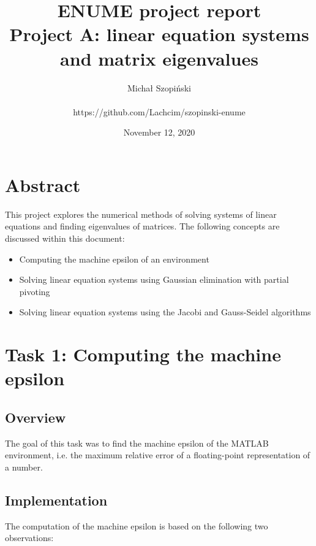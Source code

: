 \documentclass{article}
\begin{document}
	\title{ENUME project report\\Project A: linear equation systems\\and matrix
	eigenvalues}
	\author{Michał Szopiński\\\\https://github.com/Lachcim/szopinski-enume}
	\date{November 12, 2020}
	\maketitle
	
	
	\setcounter{section}{-1}
	\section{Abstract}
	
	This project explores the numerical methods of solving systems of linear
	equations and finding eigenvalues of matrices. The following concepts are
	discussed within this document:
	
	\begin{itemize}
		\item Computing the machine epsilon of an environment
		\item Solving linear equation systems using Gaussian elimination with
		partial pivoting
		\item Solving linear equation systems using the Jacobi and Gauss-Seidel
		algorithms
	\end{itemize}
	
	\newpage
	
	\section{Task 1: Computing the machine epsilon}
	
	\subsection{Overview}
	
	The goal of this task was to find the machine epsilon of the MATLAB
	environment, i.e. the maximum relative error of a floating-point
	representation of a number.
	
	\subsection{Implementation}
	
	The computation of the machine epsilon is based on the following two
	observations:
	
\end{document}
